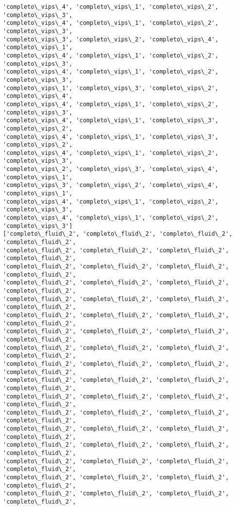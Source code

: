 \documentclass[11pt]{article}
\begin{document}
\begin{Verbatim}[commandchars=\\\{\}]
'completo\_vips\_4', 'completo\_vips\_1', 'completo\_vips\_2', 'completo\_vips\_3',
'completo\_vips\_4', 'completo\_vips\_1', 'completo\_vips\_2', 'completo\_vips\_3',
'completo\_vips\_3', 'completo\_vips\_2', 'completo\_vips\_4', 'completo\_vips\_1',
'completo\_vips\_4', 'completo\_vips\_1', 'completo\_vips\_2', 'completo\_vips\_3',
'completo\_vips\_4', 'completo\_vips\_1', 'completo\_vips\_2', 'completo\_vips\_3',
'completo\_vips\_1', 'completo\_vips\_3', 'completo\_vips\_2', 'completo\_vips\_4',
'completo\_vips\_4', 'completo\_vips\_1', 'completo\_vips\_2', 'completo\_vips\_3',
'completo\_vips\_4', 'completo\_vips\_1', 'completo\_vips\_3', 'completo\_vips\_2',
'completo\_vips\_4', 'completo\_vips\_1', 'completo\_vips\_3', 'completo\_vips\_2',
'completo\_vips\_4', 'completo\_vips\_1', 'completo\_vips\_2', 'completo\_vips\_3',
'completo\_vips\_2', 'completo\_vips\_3', 'completo\_vips\_4', 'completo\_vips\_1',
'completo\_vips\_3', 'completo\_vips\_2', 'completo\_vips\_4', 'completo\_vips\_1',
'completo\_vips\_4', 'completo\_vips\_1', 'completo\_vips\_2', 'completo\_vips\_3',
'completo\_vips\_4', 'completo\_vips\_1', 'completo\_vips\_2', 'completo\_vips\_3']
['completo\_fluid\_2', 'completo\_fluid\_2', 'completo\_fluid\_2', 'completo\_fluid\_2',
'completo\_fluid\_2', 'completo\_fluid\_2', 'completo\_fluid\_2', 'completo\_fluid\_2',
'completo\_fluid\_2', 'completo\_fluid\_2', 'completo\_fluid\_2', 'completo\_fluid\_2',
'completo\_fluid\_2', 'completo\_fluid\_2', 'completo\_fluid\_2', 'completo\_fluid\_2',
'completo\_fluid\_2', 'completo\_fluid\_2', 'completo\_fluid\_2', 'completo\_fluid\_2',
'completo\_fluid\_2', 'completo\_fluid\_2', 'completo\_fluid\_2', 'completo\_fluid\_2',
'completo\_fluid\_2', 'completo\_fluid\_2', 'completo\_fluid\_2', 'completo\_fluid\_2',
'completo\_fluid\_2', 'completo\_fluid\_2', 'completo\_fluid\_2', 'completo\_fluid\_2',
'completo\_fluid\_2', 'completo\_fluid\_2', 'completo\_fluid\_2', 'completo\_fluid\_2',
'completo\_fluid\_2', 'completo\_fluid\_2', 'completo\_fluid\_2', 'completo\_fluid\_2',
'completo\_fluid\_2', 'completo\_fluid\_2', 'completo\_fluid\_2', 'completo\_fluid\_2',
'completo\_fluid\_2', 'completo\_fluid\_2', 'completo\_fluid\_2', 'completo\_fluid\_2',
'completo\_fluid\_2', 'completo\_fluid\_2', 'completo\_fluid\_2', 'completo\_fluid\_2',
'completo\_fluid\_2', 'completo\_fluid\_2', 'completo\_fluid\_2', 'completo\_fluid\_2',
'completo\_fluid\_2', 'completo\_fluid\_2', 'completo\_fluid\_2', 'completo\_fluid\_2',
'completo\_fluid\_2', 'completo\_fluid\_2', 'completo\_fluid\_2', 'completo\_fluid\_2',
'completo\_fluid\_2', 'completo\_fluid\_2', 'completo\_fluid\_2', 'completo\_fluid\_2',

\end{Verbatim}
\end{document}
